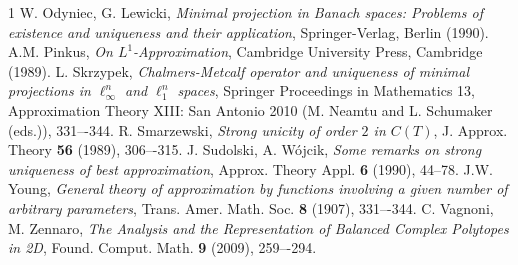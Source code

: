 \documentclass[12pt, reqno]{amsart}
\theoremstyle{definition}
\theoremstyle{remark}
\numberwithin{equation}{section}
\begin{document}
\begin{thebibliography}{1}
 W. Odyniec, G. Lewicki, \emph{Minimal projection in Banach spaces: Problems of existence and uniqueness and their application}, Springer-Verlag, Berlin (1990).
 A.M. Pinkus, \emph{On $L^1$-Approximation}, Cambridge University Press, Cambridge (1989).
 L. Skrzypek, \emph{Chalmers-Metcalf operator and uniqueness of minimal projections in $\ell_{\infty}^n$ and $\ell_1^n$ spaces}, Springer Proceedings in Mathematics 13, Approximation Theory XIII: San Antonio 2010 (M. Neamtu and L. Schumaker (eds.)), 331–-344.
 R. Smarzewski, \emph{Strong unicity of order $2$ in $C(T)$}, J. Approx. Theory \textbf{56} (1989), 306–-315.
 J. Sudolski, A. Wójcik, \emph{Some remarks on strong uniqueness of best approximation}, Approx. Theory Appl. \textbf{6} (1990), 44--78. J.W. Young, \emph{General theory of approximation by functions involving a given number of arbitrary parameters}, Trans. Amer. Math. Soc. \textbf{8} (1907), 331–-344.
 C. Vagnoni, M. Zennaro, \emph{The Analysis and the Representation of Balanced Complex Polytopes
in 2D}, Found. Comput. Math. \textbf{9} (2009), 259–-294.
\end{thebibliography}
\end{document}
